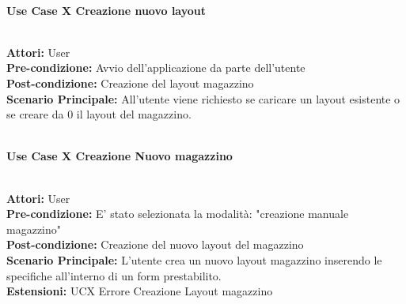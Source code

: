 \Large\textbf{}\\
\Large\textbf{Use Case X Creazione nuovo layout} \\
\vspace{0.5cm}

\large\textbf{} \\
\textbf{Attori:} User\\
\textbf{Pre-condizione:} Avvio dell'applicazione da parte dell'utente\\
\textbf{Post-condizione: } Creazione del layout magazzino\\
\textbf{Scenario Principale:}  All'utente viene richiesto se caricare un layout esistente o se creare da 0 il layout del magazzino.\\

\vspace{0.5cm}

\Large\textbf{}\\
\Large\textbf{Use Case X Creazione Nuovo magazzino} \\
\vspace{0.5cm}

\large\textbf{} \\
\textbf{Attori:} User\\
\textbf{Pre-condizione:} E' stato selezionata la modalità: "creazione manuale magazzino" \\
\textbf{Post-condizione: } Creazione del nuovo layout del magazzino\\
\textbf{Scenario Principale:}  L'utente crea un nuovo layout magazzino inserendo le specifiche all'interno di un form prestabilito.\\
\textbf{Estensioni: } UCX Errore Creazione Layout magazzino\\

\vspace{0.5cm}

\textbf{}\\
{} \\
{}\\


